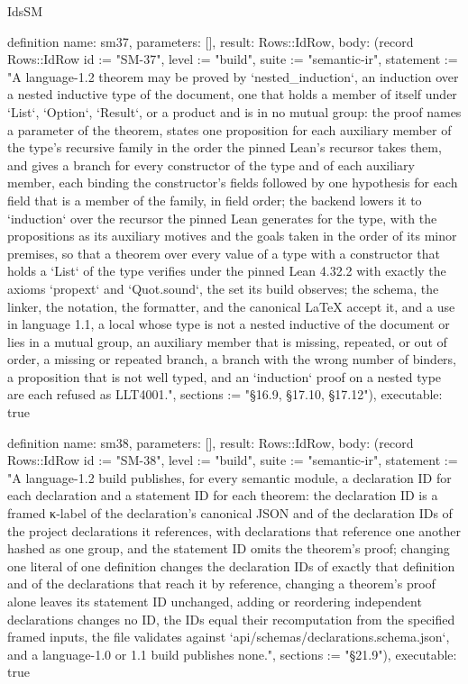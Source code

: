 \begin{lexlean}{IdsSM}
\begin{semanticmodule}
definition{
  name: sm37,
  parameters: [],
  result: Rows::IdRow,
  body: (record Rows::IdRow {id := "SM-37", level := "build", suite := "semantic-ir", statement := "A language-1.2 theorem may be proved by `nested_induction`, an induction over a nested inductive type of the document, one that holds a member of itself under `List`, `Option`, `Result`, or a product and is in no mutual group: the proof names a parameter of the theorem, states one proposition for each auxiliary member of the type's recursive family in the order the pinned Lean's recursor takes them, and gives a branch for every constructor of the type and of each auxiliary member, each binding the constructor's fields followed by one hypothesis for each field that is a member of the family, in field order; the backend lowers it to `induction` over the recursor the pinned Lean generates for the type, with the propositions as its auxiliary motives and the goals taken in the order of its minor premises, so that a theorem over every value of a type with a constructor that holds a `List` of the type verifies under the pinned Lean 4.32.2 with exactly the axioms `propext` and `Quot.sound`, the set its build observes; the schema, the linker, the notation, the formatter, and the canonical LaTeX accept it, and a use in language 1.1, a local whose type is not a nested inductive of the document or lies in a mutual group, an auxiliary member that is missing, repeated, or out of order, a missing or repeated branch, a branch with the wrong number of binders, a proposition that is not well typed, and an `induction` proof on a nested type are each refused as LLT4001.", sections := "§16.9, §17.10, §17.12"}),
  executable: true
}

definition{
  name: sm38,
  parameters: [],
  result: Rows::IdRow,
  body: (record Rows::IdRow {id := "SM-38", level := "build", suite := "semantic-ir", statement := "A language-1.2 build publishes, for every semantic module, a declaration ID for each declaration and a statement ID for each theorem: the declaration ID is a framed κ-label of the declaration's canonical JSON and of the declaration IDs of the project declarations it references, with declarations that reference one another hashed as one group, and the statement ID omits the theorem's proof; changing one literal of one definition changes the declaration IDs of exactly that definition and of the declarations that reach it by reference, changing a theorem's proof alone leaves its statement ID unchanged, adding or reordering independent declarations changes no ID, the IDs equal their recomputation from the specified framed inputs, the file validates against `api/schemas/declarations.schema.json`, and a language-1.0 or 1.1 build publishes none.", sections := "§21.9"}),
  executable: true
}


\end{semanticmodule}
\end{lexlean}
